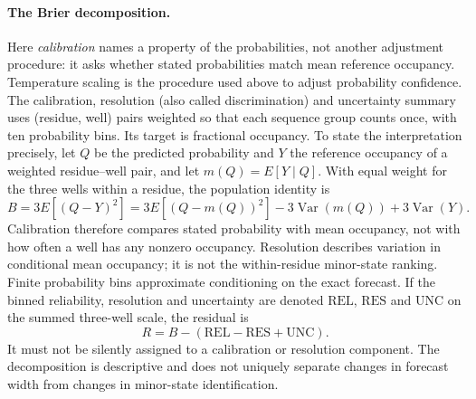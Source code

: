 \documentclass[10pt,a4paper]{article}
\begin{document}
\paragraph{The Brier decomposition.} Here \emph{calibration} names a property of the probabilities, not another adjustment procedure: it asks whether stated probabilities match mean reference occupancy. Temperature scaling is the procedure used above to adjust probability confidence. The calibration, resolution (also called
discrimination) and uncertainty summary~\citep{murphy1973partition} uses
(residue, well) pairs weighted so that each sequence group counts once, with ten
probability bins. Its target is fractional occupancy. To state the interpretation
precisely, let $Q$ be the predicted probability and $Y$ the reference occupancy
of a weighted residue--well pair, and let $m(Q)=E[Y\mid Q]$. With equal weight for
the three wells within a residue, the population identity is
\[
 B=3E[(Q-Y)^2]
  =3E[(Q-m(Q))^2]-3\operatorname{Var}(m(Q))
   +3\operatorname{Var}(Y).
\]
Calibration therefore compares stated probability with mean occupancy, not with
how often a well has any nonzero occupancy. Resolution describes variation in
conditional mean occupancy; it is not the within-residue minor-state ranking.
Finite probability bins approximate conditioning on the exact forecast. If the
binned reliability, resolution and uncertainty are denoted $\mathrm{REL}$,
$\mathrm{RES}$ and $\mathrm{UNC}$ on the summed three-well scale, the residual is
\[
 R=B-(\mathrm{REL}-\mathrm{RES}+\mathrm{UNC}).
\]
It must not be silently assigned to a calibration or resolution component. The
decomposition is descriptive and does not uniquely separate changes in forecast
width from changes in minor-state identification.
\FloatBarrier

\end{document}
